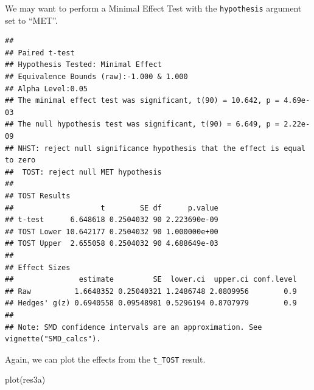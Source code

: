 \documentclass[]{interact}
\theoremstyle{plain}%
\theoremstyle{definition}
\theoremstyle{remark}
\newenvironment{Shaded}{\begin{snugshade}}{\end{snugshade}}
\newcommand{\AttributeTok}[1]{\textcolor[rgb]{0.77,0.63,0.00}{#1}}
\newcommand{\ConstantTok}[1]{\textcolor[rgb]{0.00,0.00,0.00}{#1}}
\newcommand{\DecValTok}[1]{\textcolor[rgb]{0.00,0.00,0.81}{#1}}
\newcommand{\FunctionTok}[1]{\textcolor[rgb]{0.00,0.00,0.00}{#1}}
\newcommand{\NormalTok}[1]{#1}
\newcommand{\OtherTok}[1]{\textcolor[rgb]{0.56,0.35,0.01}{#1}}
\newcommand{\SpecialCharTok}[1]{\textcolor[rgb]{0.00,0.00,0.00}{#1}}
\newcommand{\StringTok}[1]{\textcolor[rgb]{0.31,0.60,0.02}{#1}}
\begin{document}
We may want to perform a Minimal Effect Test with the
\texttt{hypothesis} argument set to ``MET''.

\begin{Shaded}
\end{Shaded}

\begin{verbatim}
## 
## Paired t-test
## Hypothesis Tested: Minimal Effect
## Equivalence Bounds (raw):-1.000 & 1.000
## Alpha Level:0.05
## The minimal effect test was significant, t(90) = 10.642, p = 4.69e-03
## The null hypothesis test was significant, t(90) = 6.649, p = 2.22e-09
## NHST: reject null significance hypothesis that the effect is equal to zero 
##  TOST: reject null MET hypothesis
## 
## TOST Results 
##                    t        SE df      p.value
## t-test      6.648618 0.2504032 90 2.223690e-09
## TOST Lower 10.642177 0.2504032 90 1.000000e+00
## TOST Upper  2.655058 0.2504032 90 4.688649e-03
## 
## Effect Sizes 
##               estimate         SE  lower.ci  upper.ci conf.level
## Raw          1.6648352 0.25040321 1.2486748 2.0809956        0.9
## Hedges' g(z) 0.6940558 0.09548981 0.5296194 0.8707979        0.9
## 
## Note: SMD confidence intervals are an approximation. See vignette("SMD_calcs").
\end{verbatim}

Again, we can plot the effects from the \texttt{t\_TOST} result.

\begin{Shaded}
\begin{Highlighting}[]
\FunctionTok{plot}\NormalTok{(res3a)}
\end{Highlighting}
\end{Shaded}
\end{document}
